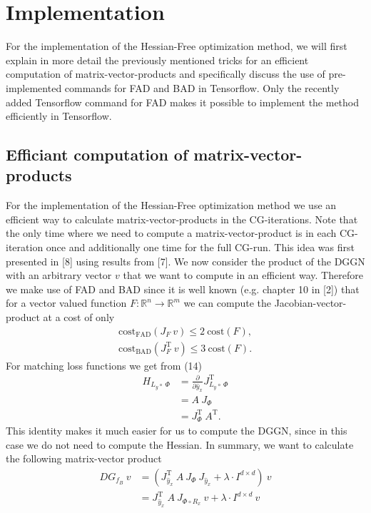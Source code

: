 \documentclass[conference]{IEEEtran}
\begin{document}
\section {Implementation}
For the implementation of the Hessian-Free optimization method, we will first explain in more detail the previously mentioned tricks for an efficient computation of matrix-vector-products and specifically discuss the use of pre-implemented commands for FAD and BAD in Tensorflow. Only the recently added Tensorflow command for FAD makes it possible to implement the method efficiently in Tensorflow.


\subsection{Efficiant computation of matrix-vector-products}
For the implementation of the Hessian-Free optimization method we use an efficient way to calculate matrix-vector-products in the CG-iterations. Note that the only time where we need to compute a matrix-vector-product is in each CG-iteration once and additionally one time for the full CG-run. This idea was first presented in [8] using results from [7]. We now consider the product of the DGGN with an arbitrary vector $v$ that we want to compute in an efficient way.
Therefore we make use of FAD and BAD since it is well known (e.g. chapter 10 in [2]) that for a vector valued function $F:\mathbb{R}^{n}\rightarrow\mathbb{R}^{m}$ we can compute the Jacobian-vector-product at a cost of only
\begin{align}
\mathrm{cost}_{\text{FAD}}(J_{F}\:v)\leq 2\:\mathrm{cost}(F),\\
\mathrm{cost}_{\text{BAD}}(J_{F}^{\mathrm{T}}\:v)\leq 3\:\mathrm{cost}(F).
\end{align}
For matching loss functions we get from (14)
\begin{align}
H_{L_{y}\circ\:\Phi} &= \frac{\partial}{\partial \hat{y}_{x}}J_{L_{y}\circ\:\Phi}^{\mathrm{T}} \\
&= A\:J_{\Phi} \\
&= J_{\Phi}^{\mathrm{T}}\:A^{\mathrm{T}}.
\end{align}
This identity makes it much easier for us to compute the DGGN, since in this case we do not need to compute the Hessian. In summary, we want to calculate the following matrix-vector product
\begin{align}
DG_{f_{B}}\:v &=  \left(J_{\hat{y}_{x}}^{\mathrm{T}}\:A\:J_{\Phi}\:J_{\hat{y}_{x}} + \lambda\cdot I^{d\times d}\right)\:v\\
&= J_{\hat{y}_{x}}^{\mathrm{T}}\:A\:J_{\Phi\circ R _{x}}\:v + \lambda\cdot I^{d\times d}\:v
\end{align}
\end{document}
